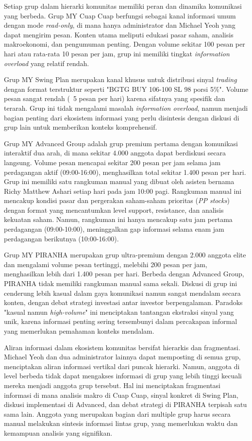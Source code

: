 Setiap grup dalam hierarki komunitas memiliki peran dan dinamika komunikasi yang berbeda. Grup MY Cuap Cuap berfungsi sebagai kanal informasi umum dengan mode \textit{read-only}, di mana hanya administrator dan Michael Yeoh yang dapat mengirim pesan. Konten utama meliputi edukasi pasar saham, analisis makroekonomi, dan pengumuman penting. Dengan volume sekitar 100 pesan per hari atau rata-rata 10 pesan per jam, grup ini memiliki tingkat \textit{information overload} yang relatif rendah.

Grup MY Swing Plan merupakan kanal khusus untuk distribusi sinyal \textit{trading} dengan format terstruktur seperti "BGTG BUY 106-100 SL 98 porsi 5\%". Volume pesan sangat rendah (~5 pesan per hari) karena sifatnya yang spesifik dan terarah. Grup ini tidak mengalami masalah \textit{information overload}, namun menjadi bagian penting dari ekosistem informasi yang perlu disintesis dengan diskusi di grup lain untuk memberikan konteks komprehensif.

Grup MY Advanced Group adalah grup premium pertama dengan komunikasi interaktif dua arah, di mana sekitar 4.000 anggota dapat berdiskusi secara langsung. Volume pesan mencapai sekitar 200 pesan per jam selama jam perdagangan aktif (09:00-16:00), menghasilkan total sekitar 1.400 pesan per hari. Grup ini memiliki satu rangkuman manual yang dibuat oleh asisten bernama Richy Matthew Ashari setiap hari pada jam 10:00 pagi. Rangkuman manual ini mencakup kondisi pasar dan pergerakan saham-saham prioritas (\textit{PP stocks}) dengan format yang mencantumkan level support, resistance, dan analisis kekuatan saham. Namun, rangkuman ini hanya mencakup satu jam pertama perdagangan (09:00-10:00), meninggalkan gap informasi selama enam jam perdagangan berikutnya (10:00-16:00).

Grup MY PIRANHA merupakan grup ultra-premium dengan 2.000 anggota elite dan mengalami volume pesan tertinggi, melebihi 200 pesan per jam, menghasilkan lebih dari 1.400 pesan per hari. Berbeda dengan Advanced Group, PIRANHA tidak memiliki rangkuman manual sama sekali. Diskusi di grup ini cenderung lebih kasual dalam gaya komunikasi namun sangat mendalam secara konten, dengan debat strategi investasi antar investor berpengalaman. Paradoks "kasual namun \textit{high-volume}" ini menciptakan tantangan ekstraksi sinyal yang unik, karena informasi penting sering tersembunyi dalam percakapan informal yang memerlukan pemahaman konteks mendalam.

Aliran informasi dalam ekosistem komunitas bersifat hierarkis dan fragmentasi. Michael Yeoh dan dua administrator lainnya dapat memposting di semua grup, menciptakan aliran informasi vertikal dari puncak hierarki. Namun, anggota di level berbeda tidak dapat mengakses informasi di grup yang lebih tinggi kecuali mereka menjadi anggota grup tersebut. Hal ini menciptakan fragmentasi informasi di mana analisis makro di Cuap Cuap, sinyal konkret di Swing Plan, diskusi implementasi di Advanced, dan debat strategi di PIRANHA terpisah satu sama lain. Anggota yang merupakan bagian dari multiple grup harus secara manual melakukan sintesis informasi lintas grup, yang memerlukan waktu dan kemampuan analisis yang signifikan.

